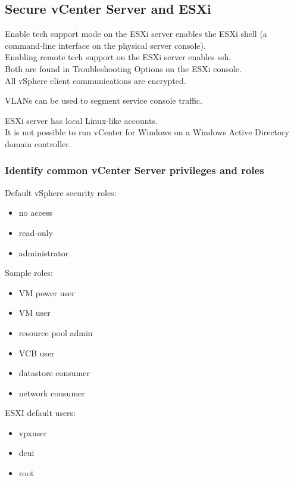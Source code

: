 \subsection{Secure vCenter Server and ESXi}

Enable tech support mode on the ESXi server enables the ESXi shell
(a command-line interface on the physical server console).\\

Enabling remote tech support on the ESXi server enables ssh.\\

Both are found in Troubleshooting Options on the ESXi console.\\

All vSphere client communications are encrypted.

VLANs can be used to segment service console traffic.

ESXi server has local Linux-like accounts.\\

It is not possible to run vCenter for Windows on a Windows Active Directory
domain controller.

\subsubsection{Identify common vCenter Server privileges and roles}

Default vSphere security roles:

\begin{itemize}
\item no access
\item read-only
\item administrator
\end{itemize}

Sample roles:

\begin{itemize}
\item VM power user
\item VM user
\item resource pool admin
\item VCB user
\item datastore consumer
\item network consumer
\end{itemize}

ESXI default users:

\begin{itemize}
\item vpxuser
\item dcui
\item root
\end{itemize}

